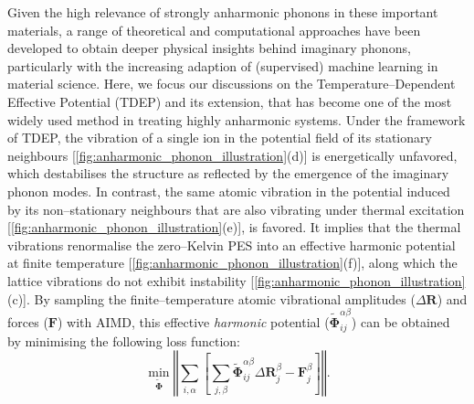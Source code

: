 Given the high relevance of strongly anharmonic phonons in these important materials, a range of theoretical and computational approaches have been developed to obtain deeper physical insights behind imaginary phonons,\cite{pallikara2022physical} particularly with the increasing adaption of (supervised) machine learning in material science. Here, we focus our discussions on the Temperature--Dependent Effective Potential (TDEP)\cite{hellman2011lattice,hellman2013temperature} and its extension,\cite{tadano2014anharmonic,eriksson2019hiphive} that has become one of the most widely used method in treating highly anharmonic systems.\cite{romero2015thermal,zhou2018electron,zhao2020quartic,ding2021soft} Under the  framework of TDEP, the vibration of a single ion in the potential field of its stationary neighbours [\cref{fig:anharmonic_phonon_illustration}(d)] is energetically unfavored, which destabilises the structure as reflected by the emergence of the imaginary phonon modes. In contrast, the same atomic vibration in the potential induced by its non--stationary neighbours that are also vibrating under thermal excitation [\cref{fig:anharmonic_phonon_illustration}(e)], is favored. It implies that the thermal vibrations renormalise the zero--Kelvin PES into an effective harmonic potential at finite temperature [\cref{fig:anharmonic_phonon_illustration}(f)], along which the lattice vibrations do not exhibit instability [\cref{fig:anharmonic_phonon_illustration}(c)]. By sampling the finite--temperature atomic vibrational amplitudes ($\Delta \bm{R}$) and forces ($\bm{F}$) with AIMD, this effective \emph{harmonic} potential ($\tilde{\bm{\Phi}}_{ij}^{\alpha\beta}$) can be obtained by minimising the following loss function\cite{hellman2011lattice}:
\begin{equation}\label{TDEP_fitting}
    \min_{\tilde{\bm{\Phi}}}\left\Vert \sum_{i,\alpha}\left[\sum_{j,\beta}\tilde{\bm{\Phi}}_{ij}^{\alpha\beta}\Delta \bm{R}_{j}^{\beta} -\bm{F}_{j}^{\beta}\right]\right\Vert.
\end{equation}

